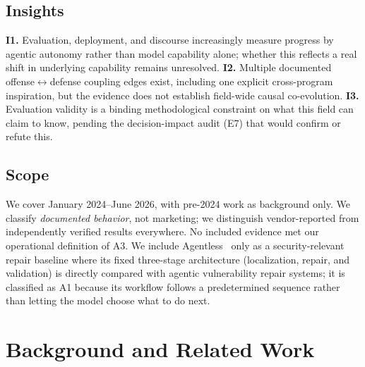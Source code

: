 \documentclass[conference,compsoc]{IEEEtran}
\begin{document}
\subsection{Insights}
\textbf{I1.} Evaluation, deployment, and discourse increasingly measure progress by
agentic autonomy rather than model capability alone; whether this reflects a real shift
in underlying capability remains unresolved.
\textbf{I2.} Multiple documented
offense$\leftrightarrow$defense coupling edges exist, including one explicit cross-program
inspiration, but the evidence does not establish field-wide causal co-evolution.
\textbf{I3.} Evaluation validity is a binding methodological constraint on
what this field can claim to know, pending the decision-impact audit (E7) that would
confirm or refute this.

\subsection{Scope}
We cover January 2024--June 2026, with pre-2024 work as background only. We classify
\emph{documented behavior}, not marketing; we distinguish vendor-reported from independently
verified results everywhere. No included evidence met our operational definition of A3. We include
Agentless~\cite{agentless2024} only as a security-relevant repair baseline where its fixed
three-stage architecture (localization, repair, and validation) is directly compared with
agentic vulnerability repair systems; it is classified as A1 because its workflow follows a
predetermined sequence rather than letting the model choose what to do next.

\vspace{6pt}
\section{Background and Related Work}
\label{sec:related}
\end{document}
